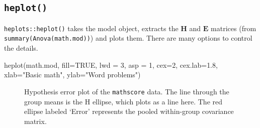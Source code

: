 \documentclass[
  letterpaper,
  10pt,
  krantz2]{krantz}
\makeatletter
\newenvironment{Shaded}{\begin{snugshade}}{\end{snugshade}}
\newcommand{\AttributeTok}[1]{\textcolor[rgb]{0.40,0.45,0.13}{#1}}
\newcommand{\CommentTok}[1]{\textcolor[rgb]{0.37,0.37,0.37}{#1}}
\newcommand{\ConstantTok}[1]{\textcolor[rgb]{0.56,0.35,0.01}{#1}}
\newcommand{\DecValTok}[1]{\textcolor[rgb]{0.68,0.00,0.00}{#1}}
\newcommand{\FloatTok}[1]{\textcolor[rgb]{0.68,0.00,0.00}{#1}}
\newcommand{\FunctionTok}[1]{\textcolor[rgb]{0.28,0.35,0.67}{#1}}
\newcommand{\NormalTok}[1]{\textcolor[rgb]{0.00,0.23,0.31}{#1}}
\newcommand{\OtherTok}[1]{\textcolor[rgb]{0.00,0.23,0.31}{#1}}
\newcommand{\SpecialCharTok}[1]{\textcolor[rgb]{0.37,0.37,0.37}{#1}}
\newcommand{\StringTok}[1]{\textcolor[rgb]{0.13,0.47,0.30}{#1}}
\newenvironment{kframe}{%
  \medskip{}
  \setlength{\fboxsep}{.8em}
  \def\at@end@of@kframe{}%
  \ifinner\ifhmode%
  \def\at@end@of@kframe{\end{minipage}}%
  \begin{minipage}{\columnwidth}%
  \fi\fi%
  \def\FrameCommand##1{\hskip\@totalleftmargin \hskip-\fboxsep
  \colorbox{shadecolor}{##1}\hskip-\fboxsep
      \hskip-\linewidth \hskip-\@totalleftmargin \hskip\columnwidth}%
  \MakeFramed {\advance\hsize-\width
    \@totalleftmargin\z@ \linewidth\hsize
    \@setminipage}}%
{\par\unskip\endMakeFramed%
  \at@end@of@kframe}
\renewenvironment{Shaded}{\begin{kframe}}{\end{kframe}}
\makeatother
\begin{document}
\begin{Shaded}
\end{Shaded}

\subsection{\texorpdfstring{\texttt{heplot()}}{heplot()}}\label{heplot}

\texttt{heplots::heplot()} takes the model object, extracts the
\(\mathbf{H}\) and \(\mathbf{E}\) matrices (from
\texttt{summary(Anova(math.mod))}) and plots them. There are many
options to control the details.

\begin{Shaded}
\begin{Highlighting}[]
\FunctionTok{heplot}\NormalTok{(math.mod, }
       \AttributeTok{fill=}\ConstantTok{TRUE}\NormalTok{, }\AttributeTok{lwd =} \DecValTok{3}\NormalTok{,}
       \AttributeTok{asp =} \DecValTok{1}\NormalTok{,}
       \AttributeTok{cex=}\DecValTok{2}\NormalTok{, }\AttributeTok{cex.lab=}\FloatTok{1.8}\NormalTok{,}
       \AttributeTok{xlab=}\StringTok{"Basic math"}\NormalTok{, }\AttributeTok{ylab=}\StringTok{"Word problems"}\NormalTok{)}
\end{Highlighting}
\end{Shaded}

\begin{figure}[H]


\caption{\label{fig-mathscore-HE}Hypothesis error plot of the
\texttt{mathscore} data. The line through the group means is the H
ellipse, which plots as a line here. The red ellipse labeled `Error'
represents the pooled within-group covariance matrix.}

\end{figure}%
\end{document}
